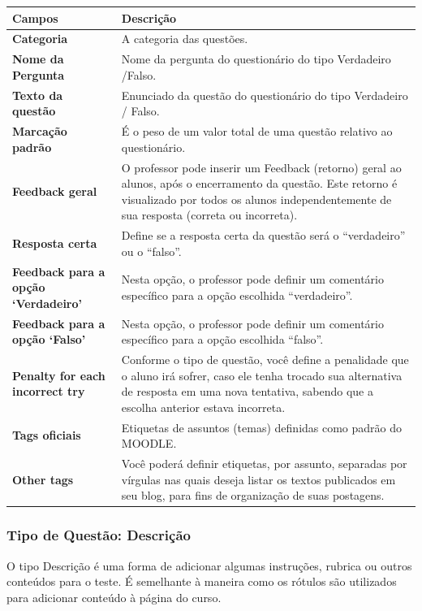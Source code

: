 \begin{longtable}{p{6cm}|p{9cm}}
     \hline
     \rowcolor[rgb]{0.8,0.8,0.8} \textbf{Campos} &  \textbf{Descrição}\\\hline
    \textbf{Categoria} & A categoria das questões. \\\hline
    \textbf{Nome da Pergunta} & Nome da pergunta do questionário do tipo Verdadeiro /Falso.\\\hline
    \textbf{Texto da questão} & Enunciado da questão do questionário do tipo Verdadeiro / Falso. \\\hline
    \textbf{Marcação padrão} & É o peso de um valor total de uma questão relativo ao questionário.   \\\hline
    \textbf{Feedback geral} &O professor  pode inserir um  Feedback (retorno)  geral  ao
alunos,  após o encerramento da questão. Este retorno é visualizado por todos os alunos independentemente de sua resposta (correta ou incorreta).
\\\hline
    \textbf{Resposta certa} &  Define se a resposta certa da questão será o “verdadeiro” ou o “falso”. \\\hline
    \textbf{Feedback para a opção ‘Verdadeiro’} &Nesta opção, o professor pode definir um comentário específico para a opção escolhida “verdadeiro”.\\\hline
    \textbf{Feedback para a opção ‘Falso’} & Nesta opção, o professor pode definir um comentário específico para a opção escolhida “falso”.\\\hline
    \textbf{Penalty for each incorrect try} & Conforme o tipo de questão, você define a  penalidade que o aluno irá sofrer, caso ele tenha trocado sua  alternativa de resposta em uma nova tentativa, sabendo que a escolha anterior estava incorreta. \\\hline
    \textbf{Tags oficiais} & Etiquetas de assuntos (temas) definidas como padrão do MOODLE. \\\hline
    \textbf{Other tags} & Você poderá definir  etiquetas,  por assunto, separadas por vírgulas nas quais deseja listar os textos publicados em seu blog, para fins de organização de suas postagens. \\\hline
\end{longtable}%

\subsubsection{Tipo de Questão: Descrição}

O tipo Descrição é uma forma de adicionar algumas instruções, rubrica ou outros conteúdos para o teste. É semelhante à maneira como os rótulos são utilizados para adicionar conteúdo à página do curso.

